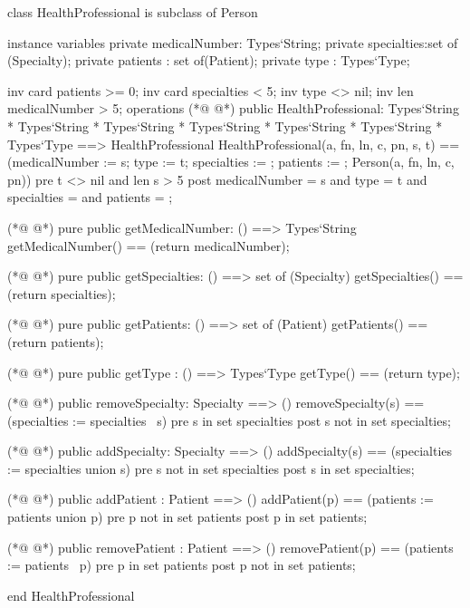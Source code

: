 \begin{vdmpp}[breaklines=true]
class HealthProfessional is subclass of Person

instance variables
  private medicalNumber: Types`String;
  private specialties:set of (Specialty);
  private patients : set of(Patient);
 private type : Types`Type;
 
 inv card patients >= 0;
  inv card specialties < 5;
 inv type <> nil;
 inv len medicalNumber > 5;
operations
(*@
\label{HealthProfessional:14}
@*)
 public HealthProfessional: Types`String * Types`String * Types`String * Types`String * Types`String * Types`String * Types`Type ==> HealthProfessional
  HealthProfessional(a, fn, ln, c, pn, s, t) == (medicalNumber := s; type := t; specialties := {}; patients := {}; Person(a, fn, ln, c, pn))
 pre t <> nil and len s > 5
 post medicalNumber = s and type = t and specialties = {} and patients = {};
 
(*@
\label{getMedicalNumber:19}
@*)
 pure public getMedicalNumber: () ==> Types`String
  getMedicalNumber() == (return medicalNumber);
 
(*@
\label{getSpecialties:22}
@*)
 pure public getSpecialties: () ==> set of (Specialty)
  getSpecialties() == (return specialties);
 
(*@
\label{getPatients:25}
@*)
 pure public getPatients: () ==> set of (Patient)
  getPatients() == (return patients);
  
(*@
\label{getType:28}
@*)
 pure public getType : () ==> Types`Type
  getType() == (return type);
  
(*@
\label{removeSpecialty:31}
@*)
 public removeSpecialty: Specialty ==> ()
  removeSpecialty(s) == (specialties := specialties \ {s})
 pre s in set specialties
 post s not in set specialties;
  
(*@
\label{addSpecialty:36}
@*)
 public addSpecialty: Specialty ==> ()
  addSpecialty(s) == (specialties := specialties union {s})
 pre s not in set specialties
 post s in set specialties;
 
(*@
\label{addPatient:41}
@*)
 public addPatient : Patient ==> ()
  addPatient(p) == (patients :=  patients union {p})
 pre p not in set patients
 post p in set patients;
 
(*@
\label{removePatient:46}
@*)
 public removePatient : Patient ==> ()
  removePatient(p) == (patients := patients \ {p})
 pre p in set patients
 post p not in set patients;

end HealthProfessional
\end{vdmpp}
\bigskip
